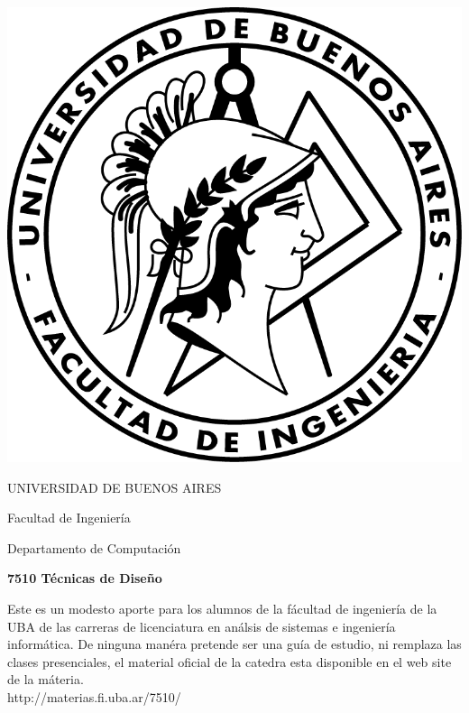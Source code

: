 \documentclass[12pt]{book}
\begin{document}
\thispagestyle{empty}

\begin {center}

\includegraphics[scale=.4]{Logo-fiuba_big.png}

\medskip
UNIVERSIDAD DE BUENOS AIRES

Facultad de Ingenier\'ia

Departamento de Computaci\'on


\vspace{3cm}


\textbf{\large 7510 T\'ecnicas de Diseño}

\vspace{2cm}


Este es un modesto aporte para los alumnos de la f\'acultad de ingenier\'ia  de la UBA de las carreras de licenciatura en an\'alsis de sistemas e ingenier\'ia inform\'atica.
De ninguna man\'era pretende ser una gu\'ia de estudio, ni remplaza las clases presenciales, el material oficial de la catedra esta disponible en el web site de la m\'ateria.
\\
http://materias.fi.uba.ar/7510/

\end {center}


\vspace{2.5cm}
\end{document}
